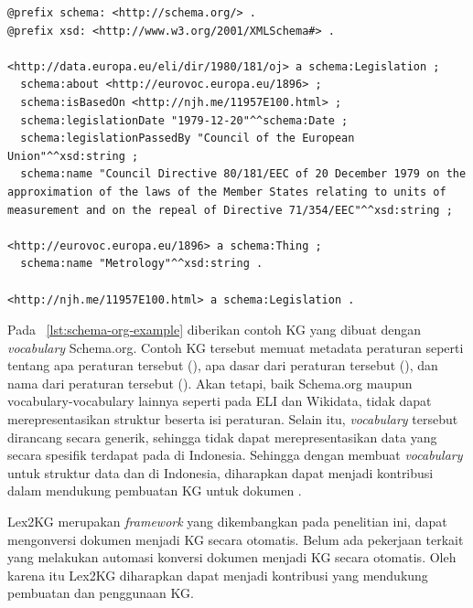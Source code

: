 \begin{listing}[H]
  \begin{verbatim}
@prefix schema: <http://schema.org/> .
@prefix xsd: <http://www.w3.org/2001/XMLSchema#> .

<http://data.europa.eu/eli/dir/1980/181/oj> a schema:Legislation ;
  schema:about <http://eurovoc.europa.eu/1896> ;
  schema:isBasedOn <http://njh.me/11957E100.html> ;
  schema:legislationDate "1979-12-20"^^schema:Date ;
  schema:legislationPassedBy "Council of the European Union"^^xsd:string ;
  schema:name "Council Directive 80/181/EEC of 20 December 1979 on the approximation of the laws of the Member States relating to units of measurement and on the repeal of Directive 71/354/EEC"^^xsd:string ;

<http://eurovoc.europa.eu/1896> a schema:Thing ;
  schema:name "Metrology"^^xsd:string .

<http://njh.me/11957E100.html> a schema:Legislation .
  \end{verbatim}
  \caption{Contoh KG metadata dokumen legal menggunakan \textit{vocabulary} Schema.org}
  \label{lst:schema-org-example}
\end{listing}

Pada \lst~\ref{lst:schema-org-example} diberikan contoh KG yang dibuat dengan \textit{vocabulary}
Schema.org. Contoh KG tersebut memuat metadata peraturan seperti tentang apa peraturan tersebut
(), apa dasar dari peraturan tersebut (), dan nama dari
peraturan tersebut (). Akan tetapi, baik Schema.org maupun vocabulary-vocabulary
lainnya seperti pada ELI dan Wikidata, tidak dapat merepresentasikan struktur beserta isi peraturan.
Selain itu, \textit{vocabulary} tersebut dirancang secara generik, sehingga tidak dapat
merepresentasikan data yang secara spesifik terdapat pada \legal di Indonesia. Sehingga dengan
membuat \textit{vocabulary} untuk struktur data dan \legal di Indonesia, diharapkan dapat menjadi
kontribusi dalam mendukung pembuatan KG untuk dokumen \legal.

Lex2KG merupakan \textit{framework} yang dikembangkan pada penelitian ini, dapat mengonversi dokumen
menjadi KG secara otomatis. Belum ada pekerjaan terkait yang melakukan automasi konversi dokumen
\legal menjadi KG secara otomatis. Oleh karena itu Lex2KG diharapkan dapat menjadi kontribusi yang
mendukung pembuatan dan penggunaan KG.

